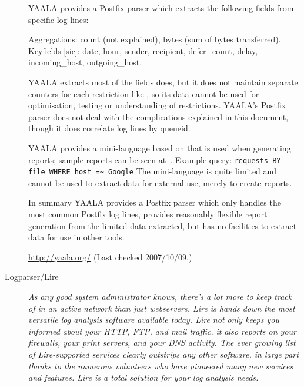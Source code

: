 \documentclass[a4paper,12pt,draft]{article}
\newcommand{\parsername}{\PLP{}}
\newcommand{\tab}[0]{%
    \hspace*{2em}%
}
\begin{document}
\begin{description}
        YAALA provides a Postfix parser which extracts the following fields
        from specific log lines:

        \tab{}Aggregations: count (not explained), bytes (sum of bytes
        transferred).\newline \tab{}Keyfields [sic]: date, hour, sender,
        recipient, defer\_count, delay, incoming\_host, outgoing\_host.

        YAALA extracts most of the fields \parsername{} does, but it does
        not maintain separate counters for each restriction like
        \parsername{}, so its data cannot be used for optimisation, testing
        or understanding of restrictions.  YAALA's Postfix parser does not
        deal with the complications explained in this document, though it
        does correlate log lines by queueid.

        YAALA provides a mini-language based on \SQL{} that is used when
        generating reports; sample reports can be seen
        at~\cite{yaala-samples}.  Example query: \newline \tab{}
        \texttt{requests BY file WHERE host =\~{} Google} \newline The
        mini-language is quite limited and cannot be used to extract data
        for external use, merely to create reports.

        In summary YAALA provides a Postfix parser which only handles the
        most common Postfix log lines, provides reasonably flexible report
        generation from the limited data extracted, but has no facilities
        to extract data for use in other tools.

        \url{http://yaala.org/} \newline (Last checked 2007/10/09.)

    \item [Logparser/Lire] \textit{As any good system administrator knows,
        there's a lot more to keep track of in an active network than just
        webservers. Lire is hands down the most versatile log analysis
        software available today. Lire not only keeps you informed about
        your HTTP, FTP, and mail traffic, it also reports on your
        firewalls, your print servers, and your DNS activity. The ever
        growing list of Lire-supported services clearly outstrips any other
        software, in large part thanks to the numerous volunteers who have
        pioneered many new services and features. Lire is a total solution
        for your log analysis needs.\/}


\end{description}
\end{document}
